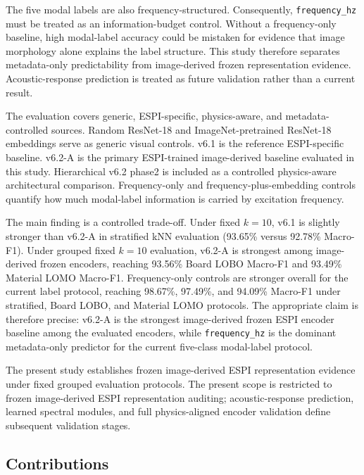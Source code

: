 \documentclass[review,3p,times]{elsarticle}
\begin{document}
The five modal labels are also frequency-structured. Consequently, \texttt{frequency\_hz} must be treated as an information-budget control. Without a frequency-only baseline, high modal-label accuracy could be mistaken for evidence that image morphology alone explains the label structure. This study therefore separates metadata-only predictability from image-derived frozen representation evidence. Acoustic-response prediction is treated as future validation rather than a current result.

The evaluation covers generic, ESPI-specific, physics-aware, and metadata-controlled sources. Random ResNet-18 and ImageNet-pretrained ResNet-18 embeddings serve as generic visual controls. v6.1 is the reference ESPI-specific baseline. v6.2-A is the primary ESPI-trained image-derived baseline evaluated in this study. Hierarchical v6.2 phase2 is included as a controlled physics-aware architectural comparison. Frequency-only and frequency-plus-embedding controls quantify how much modal-label information is carried by excitation frequency.

The main finding is a controlled trade-off. Under fixed $k=10$, v6.1 is slightly stronger than v6.2-A in stratified kNN evaluation (93.65\% versus 92.78\% Macro-F1). Under grouped fixed $k=10$ evaluation, v6.2-A is strongest among image-derived frozen encoders, reaching 93.56\% Board LOBO Macro-F1 and 93.49\% Material LOMO Macro-F1. Frequency-only controls are stronger overall for the current label protocol, reaching 98.67\%, 97.49\%, and 94.09\% Macro-F1 under stratified, Board LOBO, and Material LOMO protocols. The appropriate claim is therefore precise: v6.2-A is the strongest image-derived frozen ESPI encoder baseline among the evaluated encoders, while \texttt{frequency\_hz} is the dominant metadata-only predictor for the current five-class modal-label protocol.

The present study establishes frozen image-derived ESPI representation evidence under fixed grouped evaluation protocols. The present scope is restricted to frozen image-derived ESPI representation auditing; acoustic-response prediction, learned spectral modules, and full physics-aligned encoder validation define subsequent validation stages.

\subsection{Contributions}
\end{document}
